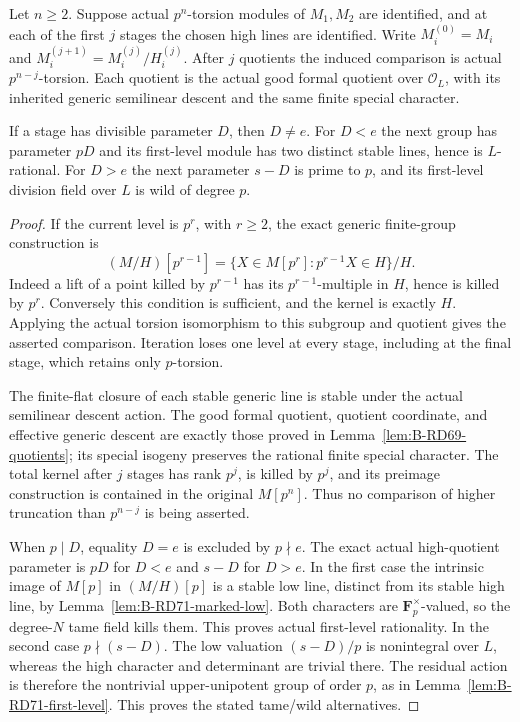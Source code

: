 \begin{lemma}
\label{lem:B-RD74-actual-levels}
Let \(n\ge2\). Suppose actual \(p^n\)-torsion modules of
\(M_1,M_2\) are identified, and at each of the first \(j\)
stages the chosen high lines are identified. Write
\(M_i^{(0)}=M_i\) and
\(M_i^{(j+1)}=M_i^{(j)}/H_i^{(j)}\).
After \(j\) quotients the induced comparison is actual
\(p^{n-j}\)-torsion. Each quotient is the actual good formal
quotient over \(\mathcal O_L\), with its inherited generic
semilinear descent and the same finite special character.

If a stage has divisible parameter \(D\), then \(D\ne e\).
For \(D<e\) the next group has parameter \(pD\) and its
first-level module has two distinct stable lines, hence is
\(L\)-rational. For \(D>e\) the next parameter \(s-D\) is
prime to \(p\), and its first-level division field over \(L\)
is wild of degree \(p\).
\end{lemma}
\begin{proof}
If the current level is \(p^r\), with \(r\ge2\), the exact
generic finite-group construction is
\[
 (M/H)[p^{r-1}]
  =\{X\in M[p^r]:p^{r-1}X\in H\}/H.
 \tag{B-RD74.3}
\]
Indeed a lift of a point killed by \(p^{r-1}\) has its
\(p^{r-1}\)-multiple in \(H\), hence is killed by \(p^r\).
Conversely this condition is sufficient, and the kernel is
exactly \(H\). Applying the actual torsion isomorphism to this
subgroup and quotient gives the asserted comparison. Iteration
loses one level at every stage, including at the final stage,
which retains only \(p\)-torsion.

The finite-flat closure of each stable generic line is stable
under the actual semilinear descent action. The good formal
quotient, quotient coordinate, and effective generic descent
are exactly those proved in
Lemma~\ref{lem:B-RD69-quotients}; its special isogeny preserves
the rational finite special character. The total kernel after
\(j\) stages has rank \(p^j\), is killed by \(p^j\), and its
preimage construction is contained in the original
\(M[p^n]\). Thus no comparison of higher truncation than
\(p^{n-j}\) is being asserted.

When \(p\mid D\), equality \(D=e\) is excluded by \(p\nmid e\).
The exact actual high-quotient parameter is \(pD\) for \(D<e\)
and \(s-D\) for \(D>e\). In the first case the intrinsic
image of \(M[p]\) in \((M/H)[p]\) is a stable low line,
distinct from its stable high line, by
Lemma~\ref{lem:B-RD71-marked-low}. Both characters are
\(\mathbf F_p^\times\)-valued, so the degree-\(N\) tame field
kills them. This proves actual first-level rationality.
In the second case \(p\nmid(s-D)\). The low valuation
\((s-D)/p\) is nonintegral over \(L\), whereas the high
character and determinant are trivial there. The residual
action is therefore the nontrivial upper-unipotent group of
order \(p\), as in Lemma~\ref{lem:B-RD71-first-level}.
This proves the stated tame/wild alternatives.
\end{proof}

